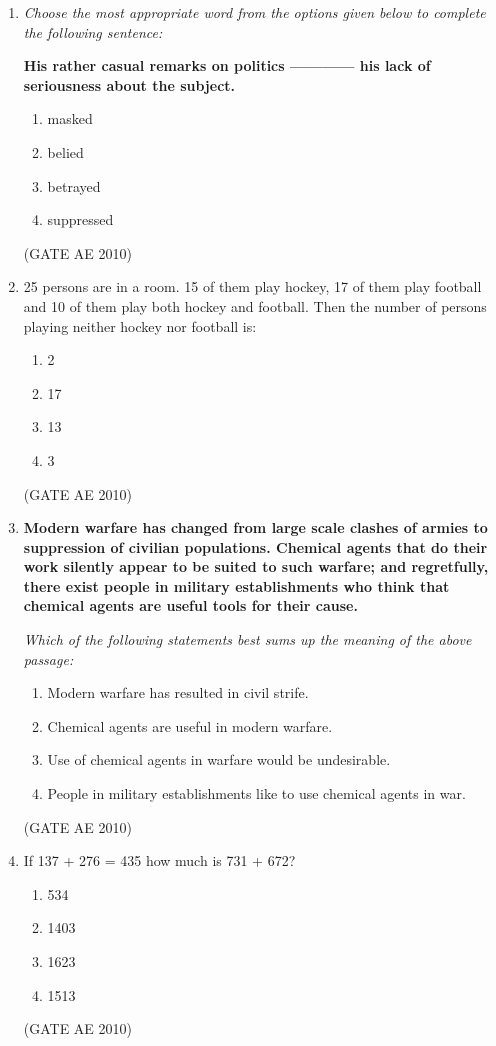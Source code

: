 \documentclass[journal]{IEEEtran}
\begin{document}
\begin{enumerate}
\item \textit{Choose the most appropriate word from the options given below to complete the following sentence:}

\textbf{His rather casual remarks on politics ------------ his lack of seriousness about the subject.}

\begin{enumerate}
\item masked
\item belied
\item betrayed
\item suppressed
\end{enumerate}
\hfill (GATE AE 2010)

\item 25 persons are in a room. 15 of them play hockey, 17 of them play football and 10 of them play both hockey and football. Then the number of persons playing neither hockey nor football is:
\begin{multicols}{4}
\begin{enumerate}
\item 2
\item 17
\item 13
\item 3
\end{enumerate}
\end{multicols}
\hfill (GATE AE 2010)

\item \textbf{Modern warfare has changed from large scale clashes of armies to suppression of civilian populations. Chemical agents that do their work silently appear to be suited to such warfare; and regretfully, there exist people in military establishments who think that chemical agents are useful tools for their cause.}
    
\textit{Which of the following statements best sums up the meaning of the above passage:}

\begin{enumerate}
\item Modern warfare has resulted in civil strife.
\item Chemical agents are useful in modern warfare.
\item Use of chemical agents in warfare would be undesirable.
\item People in military establishments like to use chemical agents in war.
\end{enumerate}
\hfill (GATE AE 2010)

\item If 137 + 276 = 435 how much is 731 + 672?
\begin{multicols}{4}
\begin{enumerate}
\item 534
\item 1403
\item 1623
\item 1513
\end{enumerate}
\end{multicols}
\hfill (GATE AE 2010)


\end{enumerate}
\end{document}
